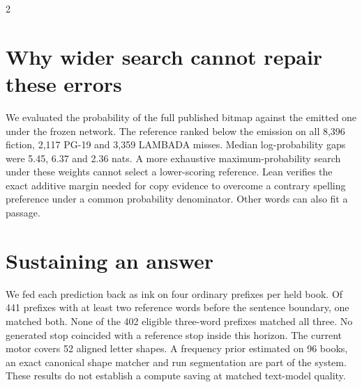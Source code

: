 \begin{multicols}{2}
\section*{Why wider search cannot repair these errors}
We evaluated the probability of the full published bitmap against the emitted one under the frozen network. The reference ranked below the emission on all 8,396 fiction, 2,117 PG-19 and 3,359 LAMBADA misses. Median log-probability gaps were 5.45, 6.37 and 2.36 nats. A more exhaustive maximum-probability search under these weights cannot select a lower-scoring reference. Lean verifies the exact additive margin needed for copy evidence to overcome a contrary spelling preference under a common probability denominator. Other words can also fit a passage.
\columnbreak
\section*{Sustaining an answer}
We fed each prediction back as ink on four ordinary prefixes per held book. Of 441 prefixes with at least two reference words before the sentence boundary, one matched both. None of the 402 eligible three-word prefixes matched all three. No generated stop coincided with a reference stop inside this horizon. The current motor covers 52 aligned letter shapes. A frequency prior estimated on 96 books, an exact canonical shape matcher and run segmentation are part of the system. These results do not establish a compute saving at matched text-model quality.
\end{multicols}

